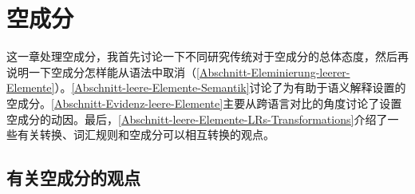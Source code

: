 
\chapter{空成分}
\label{Abschnitt-Diskussion-leere-Elemente}
\label{chap-empty}

这一章处理空成分，我首先讨论一下不同研究传统对于空成分的总体态度，然后再说明一下空成分怎样能从语法中取消（\ref{Abschnitt-Eleminierung-leerer-Elemente}）。\ref{Abschnitt-leere-Elemente-Semantik}讨论了为有助于语义解释设置的空成分。\ref{Abschnitt-Evidenz-leere-Elemente}主要从跨语言对比的角度讨论了设置空成分的动因。最后，\ref{Abschnitt-leere-Elemente-LRs-Transformations}介绍了一些有关转换、词汇规则和空成分可以相互转换的观点。

\section{有关空成分的观点}

